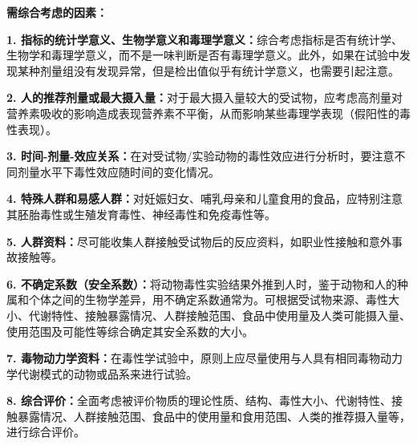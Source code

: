 \begin{defbox}
\textbf{需综合考虑的因素：}

\textbf{1. 指标的统计学意义、生物学意义和毒理学意义：}综合考虑指标是否有统计学、生物学和毒理学意义，而不是一味判断是否有毒理学意义。此外，如果在试验中发现某种剂量组没有发现异常，但是检出值似乎有统计学意义，也需要引起注意。

\textbf{2. 人的推荐剂量或最大摄入量：}对于最大摄入量较大的受试物，应考虑高剂量对营养素吸收的影响造成表现营养素不平衡，从而影响某些毒理学表现（假阳性的毒性表现）。

\textbf{3. 时间-剂量-效应关系：}在对受试物/实验动物的毒性效应进行分析时，要注意不同剂量水平下毒性效应随时间的变化情况。

\textbf{4. 特殊人群和易感人群：}对妊娠妇女、哺乳母亲和儿童食用的食品，应特别注意其胚胎毒性或生殖发育毒性、神经毒性和免疫毒性等。

\textbf{5. 人群资料：}尽可能收集人群接触受试物后的反应资料，如职业性接触和意外事故接触等。

\textbf{6. 不确定系数（安全系数）：}将动物毒性实验结果外推到人时，鉴于动物和人的种属和个体之间的生物学差异，用不确定系数通常为。可根据受试物来源、毒性大小、代谢特性、接触暴露情况、人群接触范围、食品中使用量及人类可能摄入量、使用范围及可能性等综合确定其安全系数的大小。

\textbf{7. 毒物动力学资料：}在毒性学试验中，原则上应尽量使用与人具有相同毒物动力学代谢模式的动物或品系来进行试验。

\textbf{8. 综合评价：}全面考虑被评价物质的理论性质、结构、毒性大小、代谢特性、接触暴露情况、人群接触范围、食品中的使用量和食用范围、人类的推荐摄入量等，进行综合评价。
\end{defbox}

